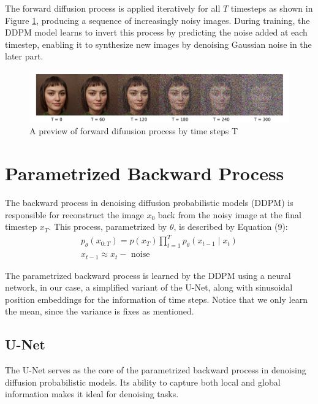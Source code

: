 \documentclass[letterpaper]{article} %
\begin{document}
The forward diffusion process is applied iteratively for all $T$ timesteps as shown in Figure \ref{fig:figure2}, producing a sequence of increasingly noisy images. During training, the DDPM model learns to invert this process by predicting the noise added at each timestep, enabling it to synthesize new images by denoising Gaussian noise in the later part.

\begin{figure}[htbp]
    \centering
    \includegraphics[width=0.88\linewidth]{f2.png} %
    \caption{A preview of forward difuusion process by time steps T}
    \label{fig:figure2}
\end{figure}

\section{Parametrized Backward Process}
The backward process in denoising diffusion probabilistic models (DDPM) is responsible for reconstruct the image $x_0$ back from the noisy image at the final timestep $x_T$. This process, parametrized by $\theta$, is described by Equation (9):
\begin{equation}
\begin{aligned}
p_\theta\left(x_{0: T}\right)=p\left(x_T\right) \prod_{t=1}^T p_\theta\left(x_{t-1} \mid x_t\right)\\
x_{t-1} \approx x_t-\text { noise }
\end{aligned}
\end{equation}

The parametrized backward process is learned by the DDPM using a neural network, in our case, a simplified variant of the U-Net, along with sinusoidal position embeddings for the information of time steps. Notice that we only learn the mean, since the variance is fixes as mentioned.

\subsection{U-Net}
The U-Net serves as the core of the parametrized backward process in denoising diffusion probabilistic models. Its ability to capture both local and global information makes it ideal for denoising tasks.
\end{document}
